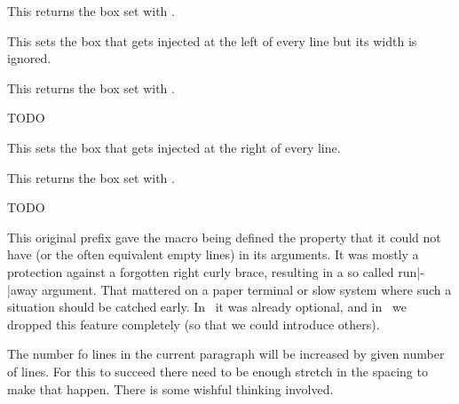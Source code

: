 \stopnewprimitive

\startnewprimitive[title={\prm {localleftboxbox}}]

This returns the box set with .

\stopnewprimitive

\startnewprimitive[title={\prm {localmiddlebox}}]

This sets the box that gets injected at the left of every line but its width
is ignored.

\stopnewprimitive

\startnewprimitive[title={\prm {localmiddleboxbox}}]

This returns the box set with .

\stopnewprimitive

\startnewprimitive[title={\prm {localpretolerance}}]
    TODO
\stopnewprimitive

\startnewprimitive[title={\prm {localrightbox}}]

This sets the box that gets injected at the right of every line.

\stopnewprimitive

\startnewprimitive[title={\prm {localrightboxbox}}]

This returns the box set with .

\stopnewprimitive

\startnewprimitive[title={\prm {localtolerance}}]
    TODO
\stopnewprimitive

\startoldprimitive[title={\prm {long}}][obsolete=yes]

This original prefix gave the macro being defined the property that it could not
have  (or the often equivalent empty lines) in its arguments. It was
mostly a protection against a forgotten right curly brace, resulting in a so called
run|-|away argument. That mattered on a paper terminal or slow system where such a
situation should be catched early. In \LUATEX\ it was already optional, and in
\LUAMETATEX\ we dropped this feature completely (so that we could introduce others).

\stopoldprimitive

\startoldprimitive[title={\prm {looseness}}]

The number fo lines in the current paragraph will be increased by given number of
lines. For this to succeed there need to be enough stretch in the spacing to make
that happen. There is some wishful thinking involved.

\stopoldprimitive


